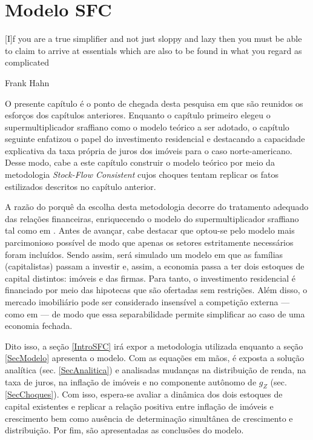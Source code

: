 
\chapter{Modelo SFC}\label{CapModelo}

\epigraph{[I]f you are a true simplifier and not just
sloppy and lazy then you must be able to claim to arrive at essentials which are also to be
found in what you regard as complicated}{Frank Hahn}

O presente capítulo é o ponto de chegada desta pesquisa em que são reunidos os esforços dos capítulos anteriores. Enquanto o capítulo primeiro elegeu o supermultiplicador sraffiano como o modelo teórico a ser adotado, o capítulo seguinte  enfatizou o papel do investimento residencial e destacando a capacidade explicativa da taxa própria de juros dos imóveis para o caso norte-americano. Desse modo, cabe a este capítulo construir o modelo teórico por meio da metodologia \textit{Stock-Flow Consistent} cujos choques tentam replicar os fatos estilizados descritos no capítulo anterior.

A razão do porquê da escolha desta metodologia decorre do tratamento adequado das relações financeiras, enriquecendo o modelo do supermultiplicador sraffiano tal como em \textcite{brochier_supermultiplier_2018}. Antes de avançar, cabe destacar que optou-se pelo modelo mais parcimonioso possível de modo que apenas os setores estritamente necessários foram incluídos. Sendo assim, será simulado um modelo em que as famílias (capitalistas) passam a investir e, assim, a economia passa a ter dois estoques de capital distintos: imóveis e das firmas. Para tanto, o investimento residencial é financiado por meio das hipotecas que são ofertadas sem restrições. 
Além disso, o mercado imobiliário pode ser considerado insensível a competição externa --- como em \textcite{duesenberry_investment_1958} --- de modo que essa separabilidade permite simplificar ao caso de uma economia fechada.


Dito isso, a seção \ref{IntroSFC} irá expor a metodologia utilizada enquanto a seção \ref{SecModelo} apresenta o modelo. Com as equações em mãos, é exposta a solução analítica (sec. \ref{SecAnalitica}) e analisadas mudanças na distribuição de renda, na taxa de juros, na inflação de imóveis e no componente autônomo de $g_Z$ (sec. \ref{SecChoques}). Com isso, espera-se avaliar a dinâmica dos dois estoques de capital existentes e replicar a relação positiva entre inflação de imóveis e crescimento bem como ausência de determinação simultânea de crescimento e distribuição.
Por fim, são apresentadas as conclusões do modelo.






